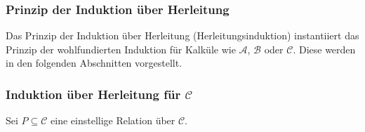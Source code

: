 															\subsubsection{Prinzip der Induktion über Herleitung}
																Das Prinzip der Induktion über Herleitung (Herleitungsinduktion) instantiiert das Prinzip der wohlfundierten Induktion für Kalküle wie $ \mathcal{A} $, $ \mathcal{B} $ oder $ \mathcal{C} $. Diese werden in den folgenden Abschnitten vorgestellt.



															\subsubsection{Induktion über Herleitung für $ \mathcal{C} $}
																Sei $ P \subseteq \mathcal{C} $ eine einstellige Relation über $ \mathcal{C} $.

